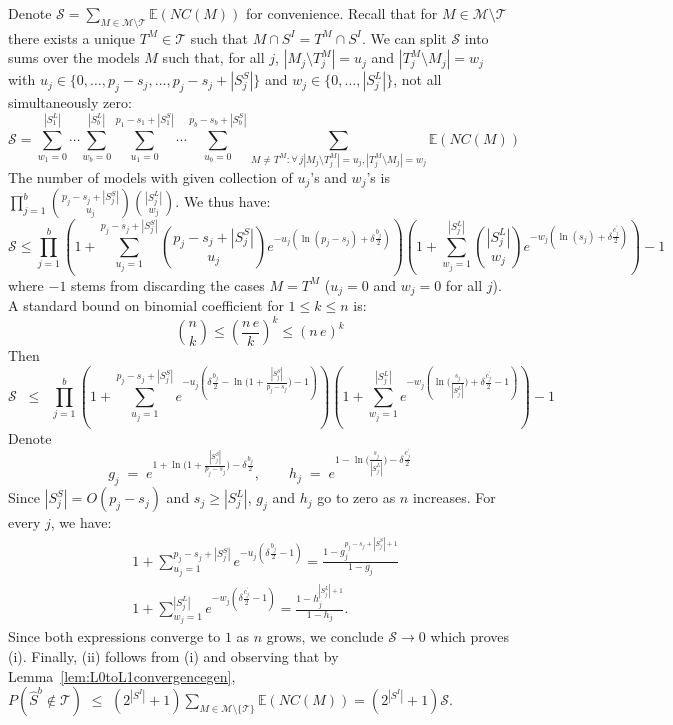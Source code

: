 \documentclass[aos]{imsart}
\theoremstyle{plain}
\newcommand{\E}{\mathbb{E}}
\newcommand{\M}{\mathcal{M}}
\newcommand{\T}{\mathcal{T}}
\begin{document}
Denote $\mathcal{S}= \sum_{M \in \M\setminus \T} \E\left(NC(M)\right)$ for convenience. Recall that for $M \in \M\setminus \T$ there exists a unique $T^M\in\T$ such that $M\cap S^I=T^M\cap S^I$.  We can split $\mathcal{S}$ into sums over the models $M$ such that, for all $j$, $|M_j\setminus T^M_j|=u_j$ and $|T^M_j\setminus M_j|=w_j$ with $u_j \in \{0,\ldots,p_j-s_j,\ldots,p_j-s_j+|S_j^S|\}$ and $w_j \in \{0,\ldots,|S^L_j|\}$, not all simultaneously zero:
$$\mathcal{S} =\sum_{w_1=0}^{|S^L_1|}\cdots\sum_{w_b=0}^{|S^L_b|}\sum_{u_1=0}^{p_1-s_1+|S_1^S|}\cdots\sum_{u_b=0}^{p_b-s_b+|S_b^S|}\sum_{M \neq T^M:\forall \,j |M_j\setminus T^M_j|=u_j, |T^M_j\setminus M_j|=w_j } \E\left(NC(M)\right)$$
The number of models with given collection of $u_j$'s and $w_j$'s is $\prod_{j=1}^b {p_j-s_j+|S_j^S| \choose u_j}{|S_j^L|\choose w_j}$. We thus have:
\begin{equation*}
    \mathcal{S} \leq \prod_{j=1}^b\left(1+\sum_{u_j=1}^{p_j-s_j+|S_j^S|}{p_j-s_j +|S_j^S|\choose u_j}e^{- u_j(\ln(p_j-s_j)+\delta \tfrac{b_j}{2})}\right)\left(1+
    \sum_{w_j=1}^{|S_j^L|}{|S_j^L| \choose w_j}
    e^{-w_j(\ln(s_j)+\delta \tfrac{c^{\prime}_j}{2})}\right) - 1
\end{equation*}
where $-1$ stems from discarding the cases $M=T^M$ ($u_j=0$ and $w_j=0$ for all $j$). A standard bound on binomial coefficient for $1\leq k\leq n$ is:
\begin{equation*}
    {n \choose k} \leq \left(\frac{n\,e}{k}\right)^k \leq \left(n\,e\right)^k
\end{equation*}
Then
\begin{equation*}
    \mathcal{S} \;\;\leq\;\; \prod_{j=1}^b\left(1+\sum_{u_j=1}^{p_j-s_j+|S_j^S|}e^{-u_j\left(\delta \tfrac{b_j}{2}-\ln\big(1+\frac{|S^S_j|}{p_j-s_j}\big)-1\right)}\right)\left(1+
    \sum_{w_j=1}^{|S_j^L|}    e^{-w_j\left(\ln\big(\frac{s_j}{|S_j^L|}\big)+\delta \tfrac{c^{\prime}_j}{2}-1\right)}\right) - 1
\end{equation*}
Denote
$$
g_j\;=\;e^{1+\ln\big(1+\frac{|S^S_j|}{p_j-s_j}\big)-\delta \tfrac{b_j}{2}},\qquad h_j\;=\;e^{1-\ln\big(\frac{s_j}{|S_j^L|}\big)-\delta \tfrac{c^{\prime}_j}{2}}
$$
Since $|S^S_j|=O(p_j-s_j)$ and $s_j\geq|S_j^L|$, $g_j$ and $h_j$ go to zero as $n$ increases.
For every $j$, we have:
\begin{align*}
    &1+\sum_{u_j=1}^{p_j-s_j+|S_j^S|}e^{-u_j\left(\delta \tfrac{b_j}{2}-1\right)}
    =\frac{1-g_j^{p_j-s_j+|S_j^S|+1}}{1-g_j} \\
    &1+\sum_{w_j=1}^{|S_j^L|}    e^{-w_j\left(\delta \tfrac{c^{\prime}_j}{2}-1\right)} =\frac{1-h_j^{|S_j^L|+1}}{1-h_j}.
\end{align*}
Since both expressions converge to $1$ as $n$ grows, we conclude $\mathcal S\to 0$ which proves (i). Finally, (ii) follows from (i) and observing that by Lemma~\ref{lem:L0toL1convergencegen}, 
$P(\hat{S}^{b} \not\in \T ) \,\,\leq \,\, (2^{|S^I|}+1) \sum_{M \in \M\setminus \{\T\}} \E\left(NC(M)\right) = (2^{|S^I|}+1) \mathcal{S}$.
\end{document}
